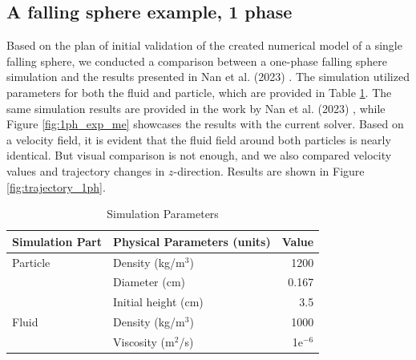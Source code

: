 \subsection{A falling sphere example, 1 phase}
Based on the plan of initial validation of the created numerical model of a single falling sphere, we conducted a comparison between a one-phase falling sphere simulation and the results presented in Nan et al. (2023) \cite{nan2023high}. The simulation utilized parameters for both the fluid and particle, which are provided in {Table \ref{table1-chap4_1}}. The same simulation results are provided in the work by Nan et al. (2023) \cite{nan2023high}, while Figure \ref{fig:1ph_exp_me} showcases the results with the current solver. Based on a velocity field, it is evident that the fluid field around both particles is nearly identical. But visual comparison is not enough, and we also compared velocity values and trajectory changes in $z$-direction. Results are shown in Figure \ref{fig:trajectory_1ph}.

\begin{table}[H]
    \centering
    \caption{Simulation Parameters} \label{table1-chap4_1}
    \begin{tabular}{llr}
        \toprule
        \hline
        Simulation Part         & Physical Parameters (units) & Value \\
        \hline
        \midrule
        Particle                 & Density (kg/m$^3$)          & 1200    \\
                         & Diameter (cm)          & 0.167    \\
                         & Initial height (cm)          & 3.5    \\
                         \hline
        Fluid                  & Density (kg/m$^3$)           & 1000   \\
                                & Viscosity (m$^2$/s)         & 1e$^{-6}$    \\
                                \hline
        \bottomrule
     \end{tabular}
\end{table}
%


